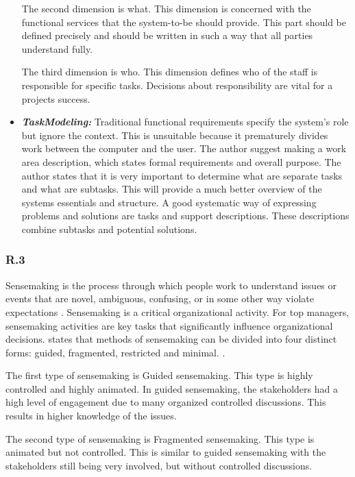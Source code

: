 \documentclass[]{article}
\begin{document}
\begin{itemize}
    The second dimension is what. 
    This dimension is concerned with the functional services that the system-to-be 
    should provide. This part should be defined precisely and should be written in 
    such a way that all parties understand fully.  

    The third dimension is who. 
    This dimension defines who of the staff is responsible for specific tasks. 
    Decisions about responsibility are vital for a projects success. 


    \item[] \textbf{\textit{TaskModeling: }}
    Traditional functional requirements specify the system's role but ignore the context. 
    This is unsuitable because it prematurely divides work between the computer and the user.
    The author suggest making a work area description, which states formal requirements 
    and overall purpose. The author states that it is very important to determine 
    what are separate tasks and what are subtasks. This will provide a much better 
    overview of the systems essentials and structure. 
    A good systematic way of expressing problems and solutions are 
    tasks and support descriptions. These descriptions combine subtasks and 
    potential solutions. 
\end{itemize} 

\subsubsection*{R.3}
Sensemaking is the process through which people work to understand issues or events that are novel, 
ambiguous, confusing, or in some other way violate expectations \cite{maitlis2014sensemaking}.
Sensemaking is a critical organizational activity. For top managers, sensemaking 
activities are key tasks that significantly influence organizational decisions\cite{maitlis2005social}.
\citeauthor{maitlis2005social} states that methods of sensemaking can be divided into four
distinct forms: guided, fragmented, restricted and minimal. \cite{maitlis2005social}. 

The first type of sensemaking is Guided sensemaking. 
This type is highly controlled and highly animated. 
In guided sensemaking, the stakeholders had a high level of engagement due to 
many organized controlled discussions.
This results in higher knowledge of the issues.

The second type of sensemaking is Fragmented sensemaking. 
This type is animated but not controlled. This is similar to guided 
sensemaking with the stakeholders still being very involved, 
but without controlled discussions.
\end{document}
